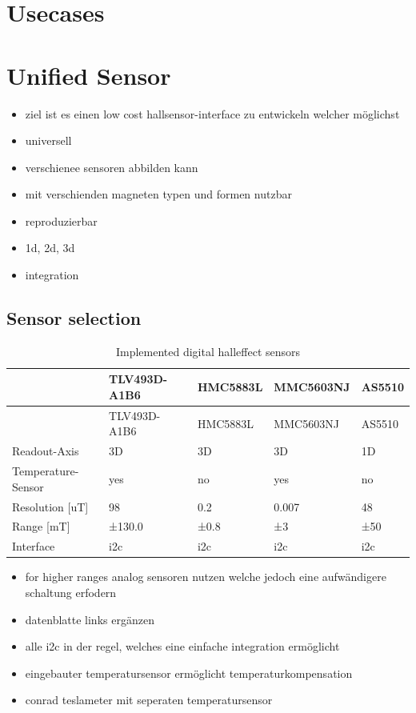\hypertarget{usecases}{%
\chapter{Usecases}\label{usecases}}

\hypertarget{unified-sensor}{%
\chapter{Unified Sensor}\label{unified-sensor}}

\begin{itemize}
\tightlist
\item
  ziel ist es einen low cost hallsensor-interface zu entwickeln welcher
  möglichst
\item
  universell
\item
  verschienee sensoren abbilden kann
\item
  mit verschienden magneten typen und formen nutzbar
\item
  reproduzierbar
\item
  1d, 2d, 3d
\item
  integration
\end{itemize}

\hypertarget{sensor-selection}{%
\section{Sensor selection}\label{sensor-selection}}

\begin{longtable}[]{@{}lllll@{}}
\caption{Implemented digital halleffect sensors
\label{Implemented_digital_halleffect_sensors.csv}}\tabularnewline
\toprule
& TLV493D-A1B6 & HMC5883L & MMC5603NJ & AS5510\tabularnewline
\midrule
\endfirsthead
\toprule
& TLV493D-A1B6 & HMC5883L & MMC5603NJ & AS5510\tabularnewline
\midrule
\endhead
Readout-Axis & 3D & 3D & 3D & 1D\tabularnewline
Temperature-Sensor & yes & no & yes & no\tabularnewline
Resolution {[}uT{]} & 98 & 0.2 & 0.007 & 48\tabularnewline
Range {[}mT{]} & ±130.0 & ±0.8 & ±3 & ±50\tabularnewline
Interface & \gls{i2c} & \gls{i2c} & \gls{i2c} & \gls{i2c}\tabularnewline
\bottomrule
\end{longtable}

\begin{itemize}
\tightlist
\item
  for higher ranges analog sensoren nutzen welche jedoch eine
  aufwändigere schaltung erfodern
\item
  datenblatte links ergänzen
\item
  alle i2c in der regel, welches eine einfache integration ermöglicht
\item
  eingebauter temperatursensor ermöglicht temperaturkompensation
\item
  conrad teslameter mit seperaten temperatursensor
\end{itemize}

